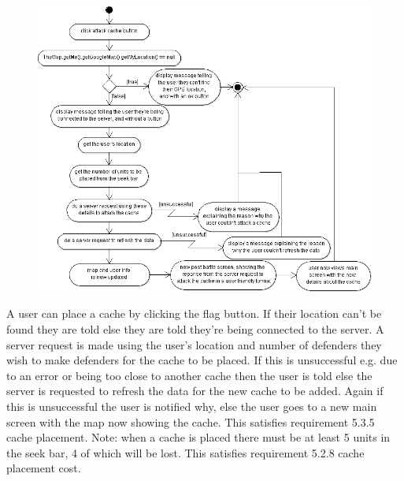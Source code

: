 \newpage
\begin{figure}
    \centering
    \includegraphics[width=\textwidth]{images/activity/attackCache}
\end{figure}

A user can place a cache by clicking the flag button. If their location can't be found they are told else they are told they're being connected to the server. A server request is made using the user's location and number of defenders they wish to make defenders for the cache to be placed. If this is unsuccessful e.g. due to an error or being too close to another cache then the user is told else the server is requested to refresh the data for the new cache to be added. Again if this is unsuccessful the user is notified why, else the user goes to a new main screen with the map now showing the cache. This satisfies requirement 5.3.5 cache placement. Note: when a cache is placed there must be at least 5 units in the seek bar, 4 of which will be lost. This satisfies requirement 5.2.8 cache placement cost.

